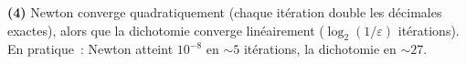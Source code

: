 \textbf{(4)} Newton converge quadratiquement (chaque it\'eration double les d\'ecimales exactes),
alors que la dichotomie converge lin\'eairement ($\log_2(1/\varepsilon)$ it\'erations).
En pratique~: Newton atteint $10^{-8}$ en $\sim5$ it\'erations,
la dichotomie en $\sim27$.

